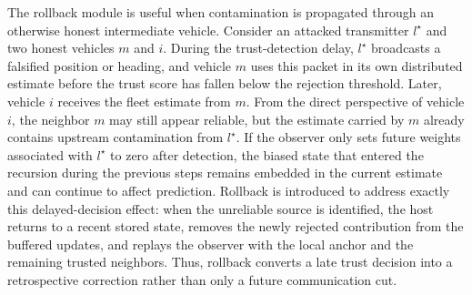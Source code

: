 \documentclass[letterpaper,journal]{IEEEtran}
\begin{document}
The rollback module is useful when contamination is propagated through an otherwise honest intermediate vehicle. Consider an attacked transmitter $l^{\star}$ and two honest vehicles $m$ and $i$. During the trust-detection delay, $l^{\star}$ broadcasts a falsified position or heading, and vehicle $m$ uses this packet in its own distributed estimate before the trust score has fallen below the rejection threshold. Later, vehicle $i$ receives the fleet estimate from $m$. From the direct perspective of vehicle $i$, the neighbor $m$ may still appear reliable, but the estimate carried by $m$ already contains upstream contamination from $l^{\star}$. If the observer only sets future weights associated with $l^{\star}$ to zero after detection, the biased state that entered the recursion during the previous steps remains embedded in the current estimate and can continue to affect prediction. Rollback is introduced to address exactly this delayed-decision effect: when the unreliable source is identified, the host returns to a recent stored state, removes the newly rejected contribution from the buffered updates, and replays the observer with the local anchor and the remaining trusted neighbors. Thus, rollback converts a late trust decision into a retrospective correction rather than only a future communication cut.
\end{document}
